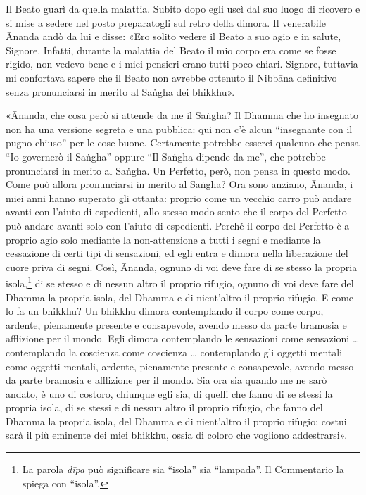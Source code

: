 Il Beato guarì da quella malattia. Subito dopo egli uscì dal suo luogo di
ricovero e si mise a sedere nel posto preparatogli sul retro della dimora. Il
venerabile Ānanda andò da lui e disse: «Ero solito vedere il Beato a suo agio e
in salute, Signore. Infatti, durante la malattia del Beato il mio corpo era come
se fosse rigido, non vedevo bene e i miei pensieri erano tutti poco chiari.
Signore, tuttavia mi confortava sapere che il Beato non avrebbe ottenuto il
Nibbāna definitivo senza pronunciarsi in merito al Saṅgha dei bhikkhu».

«Ānanda, che cosa però si attende da me il Saṅgha? Il Dhamma che ho insegnato
non ha una versione segreta e una pubblica: qui non c’è alcun “insegnante con il
pugno chiuso” per le cose buone. Certamente potrebbe esserci qualcuno che pensa
“Io governerò il Saṅgha” oppure “Il Saṅgha dipende da me”, che potrebbe
pronunciarsi in merito al Saṅgha. Un Perfetto, però, non pensa in questo modo.
Come può allora pronunciarsi in merito al Saṅgha? Ora sono anziano, Ānanda, i
miei anni hanno superato gli ottanta: proprio come un vecchio carro può andare
avanti con l’aiuto di espedienti, allo stesso modo sento che il corpo del
Perfetto può andare avanti solo con l’aiuto di espedienti. Perché il corpo del
Perfetto è a proprio agio solo mediante la non-attenzione a tutti i segni e
mediante la cessazione di certi tipi di sensazioni, ed egli entra e dimora nella
liberazione del cuore priva di segni. Così, Ānanda, ognuno di voi deve fare di
se stesso la propria isola,\footnote{La parola \emph{dīpa} può significare sia
  “isola” sia “lampada”. Il Commentario la spiega con “isola”.} di se stesso e
di nessun altro il proprio rifugio, ognuno di voi deve fare del Dhamma la
propria isola, del Dhamma e di nient’altro il proprio rifugio. E come lo fa un
bhikkhu? Un bhikkhu dimora contemplando il corpo come corpo, ardente, pienamente
presente e consapevole, avendo messo da parte bramosia e afflizione per il
mondo. Egli dimora contemplando le sensazioni come sensazioni … contemplando la
coscienza come coscienza … contemplando gli oggetti mentali come oggetti
mentali, ardente, pienamente presente e consapevole, avendo messo da parte
bramosia e afflizione per il mondo. Sia ora sia quando me ne sarò andato, è uno
di costoro, chiunque egli sia, di quelli che fanno di se stessi la propria
isola, di se stessi e di nessun altro il proprio rifugio, che fanno del Dhamma
la propria isola, del Dhamma e di nient’altro il proprio rifugio: costui sarà il
più eminente dei miei bhikkhu, ossia di coloro che vogliono addestrarsi».


